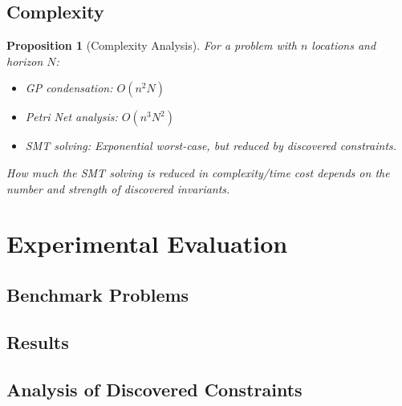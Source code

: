 \documentclass[11pt]{article}
\newtheorem{proposition}[theorem]{Proposition}
\begin{document}
\subsection{Complexity}

\begin{proposition}[Complexity Analysis]
For a problem with $n$ locations and horizon $N$:
\begin{itemize}
    \item GP condensation: $O(n^2 N)$

    \item Petri Net analysis: $O(n^3 N^2)$

    \item SMT solving: Exponential worst-case, but reduced by discovered constraints.
\end{itemize}

How much the SMT solving is reduced in complexity/time cost depends on
the number and strength of discovered invariants.

\end{proposition}

\section{Experimental Evaluation}

\subsection{Benchmark Problems}


\subsection{Results}


\subsection{Analysis of Discovered Constraints}


\end{document}

